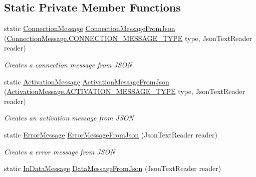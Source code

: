 \subsection*{Static Private Member Functions}
\begin{DoxyCompactItemize}
\item 
static \hyperlink{class_web_analyzer_1_1_models_1_1_message_model_1_1_connection_message}{Connection\+Message} \hyperlink{class_web_analyzer_1_1_models_1_1_message_model_1_1_message_a314276c1b58a764cb8216c85aecbc251}{Connection\+Message\+From\+Json} (\hyperlink{class_web_analyzer_1_1_models_1_1_message_model_1_1_connection_message_a0b8ebc456d3aed9c51235f2a1a1a1cdb}{Connection\+Message.\+C\+O\+N\+N\+E\+C\+T\+I\+O\+N\+\_\+\+M\+E\+S\+S\+A\+G\+E\+\_\+\+T\+Y\+P\+E} type, Json\+Text\+Reader reader)
\begin{DoxyCompactList}\small\item\em Creates a connection message from J\+S\+O\+N \end{DoxyCompactList}\item 
static \hyperlink{class_web_analyzer_1_1_models_1_1_message_model_1_1_activation_message}{Activation\+Message} \hyperlink{class_web_analyzer_1_1_models_1_1_message_model_1_1_message_a00da0edc16e3cd335dbc128c04d865de}{Activation\+Message\+From\+Json} (\hyperlink{class_web_analyzer_1_1_models_1_1_message_model_1_1_activation_message_ad3b5847039dd26527a842c6f7675b1b2}{Activation\+Message.\+A\+C\+T\+I\+V\+A\+T\+I\+O\+N\+\_\+\+M\+E\+S\+S\+A\+G\+E\+\_\+\+T\+Y\+P\+E} type, Json\+Text\+Reader reader)
\begin{DoxyCompactList}\small\item\em Creates an activation message from J\+S\+O\+N \end{DoxyCompactList}\item 
static \hyperlink{class_web_analyzer_1_1_models_1_1_message_model_1_1_error_message}{Error\+Message} \hyperlink{class_web_analyzer_1_1_models_1_1_message_model_1_1_message_a8a0c7229b12b93ecea85d87799507906}{Error\+Message\+From\+Json} (Json\+Text\+Reader reader)
\begin{DoxyCompactList}\small\item\em Creates a error message from J\+S\+O\+N \end{DoxyCompactList}\item 
static \hyperlink{class_web_analyzer_1_1_models_1_1_message_model_1_1_in_data_message}{In\+Data\+Message} \hyperlink{class_web_analyzer_1_1_models_1_1_message_model_1_1_message_a09f5ab44d912bea7b3ae5e2a78eab490}{Data\+Message\+From\+Json} (Json\+Text\+Reader reader)

\end{DoxyCompactItemize}
